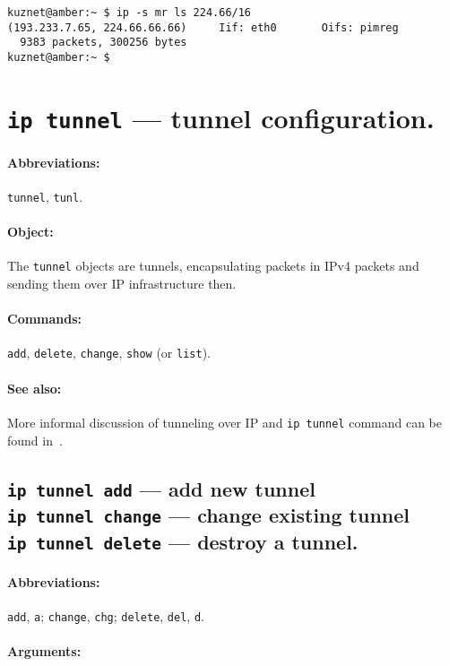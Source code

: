 \begin{verbatim}
kuznet@amber:~ $ ip -s mr ls 224.66/16
(193.233.7.65, 224.66.66.66)     Iif: eth0       Oifs: pimreg 
  9383 packets, 300256 bytes
kuznet@amber:~ $
\end{verbatim}


\section{{\tt ip tunnel} --- tunnel configuration.}
\label{IP-TUNNEL}

\paragraph{Abbreviations:} \verb|tunnel|, \verb|tunl|.

\paragraph{Object:} The \verb|tunnel| objects are tunnels, encapsulating
packets in IPv4 packets and sending them over IP infrastructure then.

\paragraph{Commands:} \verb|add|, \verb|delete|, \verb|change|, \verb|show|
(or \verb|list|).

\paragraph{See also:} More informal discussion of tunneling
over IP and \verb|ip tunnel| command can be found in~\cite{IP-TUNNELS}.

\subsection{{\tt ip tunnel add} --- add new tunnel\\
	{\tt ip tunnel change} --- change existing tunnel\\
	{\tt ip tunnel delete} --- destroy a tunnel.}

\paragraph{Abbreviations:} \verb|add|, \verb|a|; \verb|change|, \verb|chg|;
\verb|delete|, \verb|del|, \verb|d|.


\paragraph{Arguments:}

